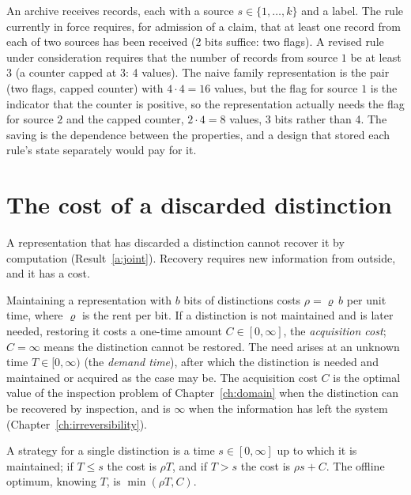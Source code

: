 \begin{example}\label{ex:archive}
An archive receives records, each with a source $s\in\{1,\dots,k\}$ and a label. The rule currently in force requires, for admission of a claim, that at least one record from each of two sources has been received (2 bits suffice: two flags). A revised rule under consideration requires that the number of records from source $1$ be at least $3$ (a counter capped at $3$: 4 values). The naive family representation is the pair (two flags, capped counter) with $4\cdot4=16$ values, but the flag for source $1$ is the indicator that the counter is positive, so the representation actually needs the flag for source $2$ and the capped counter, $2\cdot4=8$ values, 3 bits rather than 4. The saving is the dependence between the properties, and a design that stored each rule's state separately would pay for it.
\end{example}

\section{The cost of a discarded distinction}

A representation that has discarded a distinction cannot recover it by computation (Result~\ref{a:joint}). Recovery requires new information from outside, and it has a cost.

\begin{definition}\label{def:cost-model}
Maintaining a representation with $b$ bits of distinctions costs $\rho=\varrho\,b$ per unit time, where $\varrho$ is the rent per bit. If a distinction is not maintained and is later needed, restoring it costs a one-time amount $C\in[0,\infty]$, the \emph{acquisition cost}; $C=\infty$ means the distinction cannot be restored. The need arises at an unknown time $T\in[0,\infty)$ (the \emph{demand time}), after which the distinction is needed and maintained or acquired as the case may be. The acquisition cost $C$ is the optimal value of the inspection problem of Chapter~\ref{ch:domain} when the distinction can be recovered by inspection, and is $\infty$ when the information has left the system (Chapter~\ref{ch:irreversibility}).
\end{definition}

A strategy for a single distinction is a time $s\in[0,\infty]$ up to which it is maintained; if $T\le s$ the cost is $\rho T$, and if $T>s$ the cost is $\rho s+C$. The offline optimum, knowing $T$, is $\min(\rho T,C)$.

